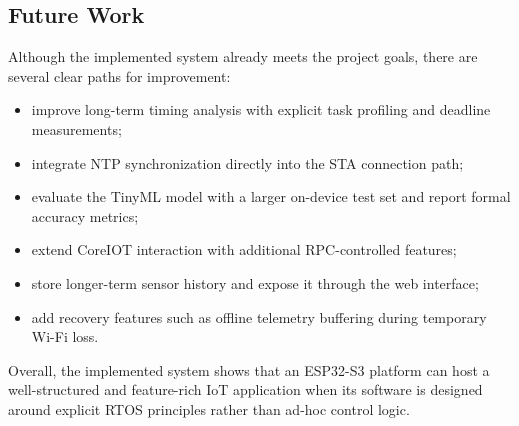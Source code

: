 \subsection{Future Work}
Although the implemented system already meets the project goals, there are
several clear paths for improvement:
\begin{itemize}
  \item improve long-term timing analysis with explicit task profiling and
  deadline measurements;
  \item integrate NTP synchronization directly into the STA connection path;
  \item evaluate the TinyML model with a larger on-device test set and report
  formal accuracy metrics;
  \item extend CoreIOT interaction with additional RPC-controlled features;
  \item store longer-term sensor history and expose it through the web
  interface;
  \item add recovery features such as offline telemetry buffering during
  temporary Wi-Fi loss.
\end{itemize}

Overall, the implemented system shows that an ESP32-S3 platform can host a
well-structured and feature-rich IoT application when its software is designed
around explicit RTOS principles rather than ad-hoc control logic.
